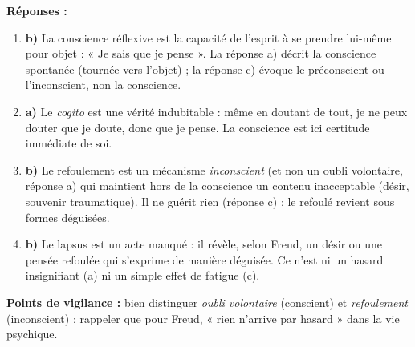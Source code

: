 \documentclass[11pt]{article}
\begin{document}
\begin{corrige}
\textbf{Réponses :}
\begin{enumerate}
\item \textbf{b)} La conscience réflexive est la capacité de l'esprit à se prendre lui-même pour objet : « Je sais que je pense ». La réponse a) décrit la conscience spontanée (tournée vers l'objet) ; la réponse c) évoque le préconscient ou l'inconscient, non la conscience.
\item \textbf{a)} Le \emph{cogito} est une vérité indubitable : même en doutant de tout, je ne peux douter que je doute, donc que je pense. La conscience est ici certitude immédiate de soi.
\item \textbf{b)} Le refoulement est un mécanisme \emph{inconscient} (et non un oubli volontaire, réponse a) qui maintient hors de la conscience un contenu inacceptable (désir, souvenir traumatique). Il ne guérit rien (réponse c) : le refoulé revient sous formes déguisées.
\item \textbf{b)} Le lapsus est un acte manqué : il révèle, selon Freud, un désir ou une pensée refoulée qui s'exprime de manière déguisée. Ce n'est ni un hasard insignifiant (a) ni un simple effet de fatigue (c).
\end{enumerate}
\textbf{Points de vigilance :} bien distinguer \emph{oubli volontaire} (conscient) et \emph{refoulement} (inconscient) ; rappeler que pour Freud, « rien n'arrive par hasard » dans la vie psychique.
\end{corrige}
\end{document}
